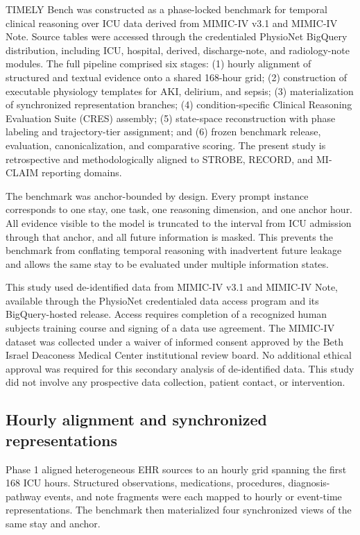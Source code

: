 \documentclass[pdflatex,sn-nature]{sn-jnl}
\begin{document}
TIMELY Bench was constructed as a phase-locked benchmark for temporal clinical reasoning over ICU data derived from MIMIC-IV v3.1 and MIMIC-IV Note\cite{johnson2023mimic}. Source tables were accessed through the credentialed PhysioNet BigQuery distribution, including ICU, hospital, derived, discharge-note, and radiology-note modules. The full pipeline comprised six stages: (1) hourly alignment of structured and textual evidence onto a shared 168-hour grid; (2) construction of executable physiology templates for AKI, delirium, and sepsis; (3) materialization of synchronized representation branches; (4) condition-specific Clinical Reasoning Evaluation Suite (CRES) assembly; (5) state-space reconstruction with phase labeling and trajectory-tier assignment; and (6) frozen benchmark release, evaluation, canonicalization, and comparative scoring. The present study is retrospective and methodologically aligned to STROBE, RECORD, and MI-CLAIM reporting domains\cite{vonelm2007strobe,benchimol2015record,norgeot2020miclaim}.

The benchmark was anchor-bounded by design. Every prompt instance corresponds to one stay, one task, one reasoning dimension, and one anchor hour. All evidence visible to the model is truncated to the interval from ICU admission through that anchor, and all future information is masked. This prevents the benchmark from conflating temporal reasoning with inadvertent future leakage and allows the same stay to be evaluated under multiple information states.

This study used de-identified data from MIMIC-IV v3.1 and MIMIC-IV Note, available through the PhysioNet credentialed data access program and its BigQuery-hosted release. Access requires completion of a recognized human subjects training course and signing of a data use agreement. The MIMIC-IV dataset was collected under a waiver of informed consent approved by the Beth Israel Deaconess Medical Center institutional review board. No additional ethical approval was required for this secondary analysis of de-identified data. This study did not involve any prospective data collection, patient contact, or intervention.

\subsection{Hourly alignment and synchronized representations}

Phase 1 aligned heterogeneous EHR sources to an hourly grid spanning the first 168 ICU hours. Structured observations, medications, procedures, diagnosis-pathway events, and note fragments were each mapped to hourly or event-time representations. The benchmark then materialized four synchronized views of the same stay and anchor.
\end{document}
